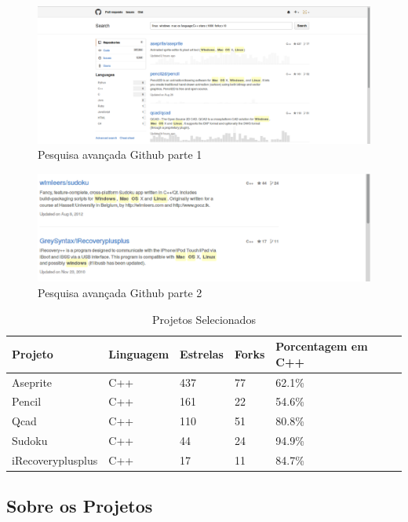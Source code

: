 \begin{figure}[h]
    \centering
        \includegraphics[scale=0.3]{figuras/github_search_1.eps}
    \caption{Pesquisa avançada Github parte 1}
    \label{pesquisa_github}
\end{figure}
\begin{figure}[h]
    \centering
        \includegraphics[scale=0.3]{figuras/github_search_2.eps}
    \caption{Pesquisa avançada Github parte 2}
    \label{pesquisa_github}
\end{figure}


\begin{table}[h]
\centering
\begin{tabular}{lllll}
\textbf{Projeto} & \textbf{Linguagem} & \textbf{Estrelas} & \textbf{Forks} & \textbf{Porcentagem em C++} \\ \toprule
Aseprite & C++ & 437  & 77  & 62.1\% \\ \midrule 
Pencil & C++ &  161 & 22  & 54.6\% \\ \midrule
Qcad & C++ & 110 & 51 & 80.8\% \\ \midrule 
Sudoku & C++ &  44  & 24 & 94.9\% \\ \midrule
iRecoveryplusplus & C++ & 17 & 11 & 84.7\%  \\ \bottomrule
\end{tabular} 
\caption{Projetos Selecionados}
\label{projetos_selecionados}
\end{table}


\subsection{Sobre os Projetos}

